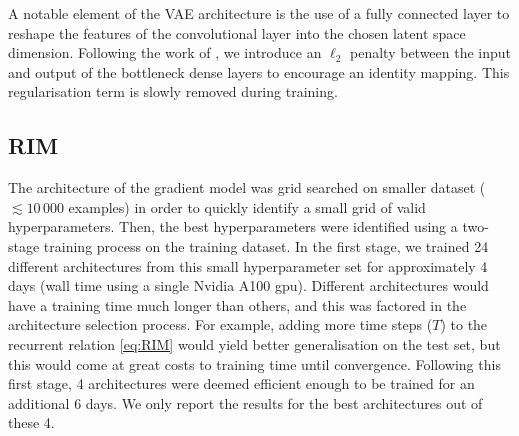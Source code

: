 A notable element of the VAE architecture is the use of a fully connected  
layer to reshape the features of the convolutional layer into the chosen 
latent space dimension. Following the work of \citet{Lanusse2021}, we introduce 
an $\ell_{2}$ penalty between the input and output of the bottleneck 
dense layers to encourage an identity mapping. This regularisation 
term is slowly removed during training.

\subsection{RIM}\label{sec:rimtraining}

The architecture of the gradient model was grid searched on 
smaller dataset ($\lesssim 10\,000$ examples) 
in order to quickly identify a small grid 
of valid hyperparameters. Then, the best hyperparameters were 
identified using a two-stage training process on the training dataset. 
In the first stage, we trained 24 different architectures from this small 
hyperparameter set for approximately 4 days (wall time using a single Nvidia A100 gpu). 
Different architectures would have a training time much longer than others, and this 
was factored in the architecture selection process. For example, adding more time 
steps ($T$) to the recurrent relation \eqref{eq:RIM} 
would yield better generalisation on the test set, but this 
would come at great costs to training time until convergence. 
Following this first stage, 4 architectures were deemed efficient enough 
to be trained for an additional 6 days. 
We only report the results for the best architectures out of these 4.
